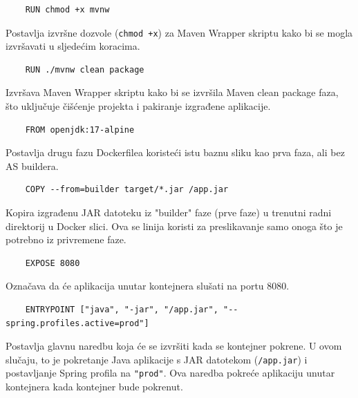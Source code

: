 \begin{packed_enum}
\begin{lstlisting}
	RUN chmod +x mvnw
\end{lstlisting}
			
			Postavlja izvršne dozvole (\texttt{chmod +x}) za Maven Wrapper skriptu kako bi se mogla izvršavati u sljedećim koracima.
			
			
			\item 
			
\begin{lstlisting}
	RUN ./mvnw clean package
\end{lstlisting}
			
			Izvršava Maven Wrapper skriptu kako bi se izvršila Maven clean package faza, što uključuje čišćenje projekta i pakiranje izgrađene aplikacije.
			
			\item 

\begin{lstlisting}
	FROM openjdk:17-alpine
\end{lstlisting}

			Postavlja drugu fazu Dockerfilea koristeći istu baznu sliku kao prva faza, ali bez AS buildera.
			
			\item 
			
\begin{lstlisting}
	COPY --from=builder target/*.jar /app.jar
\end{lstlisting}

			Kopira izgrađenu JAR datoteku iz "builder" faze (prve faze) u trenutni radni direktorij u Docker slici. Ova se linija koristi za preslikavanje samo onoga što je potrebno iz privremene faze.
			
			\item 

\begin{lstlisting}
	EXPOSE 8080
\end{lstlisting}

			Označava da će aplikacija unutar kontejnera slušati na portu 8080.
			
			
			\item 

\begin{lstlisting}
	ENTRYPOINT ["java", "-jar", "/app.jar", "--spring.profiles.active=prod"]
\end{lstlisting}

			Postavlja glavnu naredbu koja će se izvršiti kada se kontejner pokrene. U ovom slučaju, to je pokretanje Java aplikacije s JAR datotekom (\texttt{/app.jar}) i postavljanje Spring profila na \texttt{"prod"}. Ova naredba pokreće aplikaciju unutar kontejnera kada kontejner bude pokrenut.
			
			\end{packed_enum} 
			
